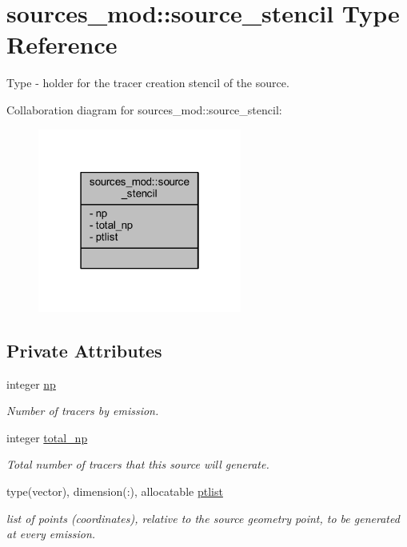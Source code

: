 \hypertarget{structsources__mod_1_1source__stencil}{}\section{sources\+\_\+mod\+:\+:source\+\_\+stencil Type Reference}
\label{structsources__mod_1_1source__stencil}


Type -\/ holder for the tracer creation stencil of the source.  




Collaboration diagram for sources\+\_\+mod\+:\+:source\+\_\+stencil\+:
\nopagebreak
\begin{figure}[H]
\begin{center}
\leavevmode
\includegraphics[width=190pt]{structsources__mod_1_1source__stencil__coll__graph}
\end{center}
\end{figure}
\subsection*{Private Attributes}
\begin{DoxyCompactItemize}
\item 
integer \mbox{\hyperlink{structsources__mod_1_1source__stencil_a11ed46a8e923b5902cc02420d88158c5}{np}}
\begin{DoxyCompactList}\small\item\em Number of tracers by emission. \end{DoxyCompactList}\item 
integer \mbox{\hyperlink{structsources__mod_1_1source__stencil_ad7373d51bdf50a4595b6c0fa69f7f915}{total\+\_\+np}}
\begin{DoxyCompactList}\small\item\em Total number of tracers that this source will generate. \end{DoxyCompactList}\item 
type(vector), dimension(\+:), allocatable \mbox{\hyperlink{structsources__mod_1_1source__stencil_a154e50e2872650da574d0a1148e3065a}{ptlist}}
\begin{DoxyCompactList}\small\item\em list of points (coordinates), relative to the source geometry point, to be generated at every emission. \end{DoxyCompactList}\end{DoxyCompactItemize}


